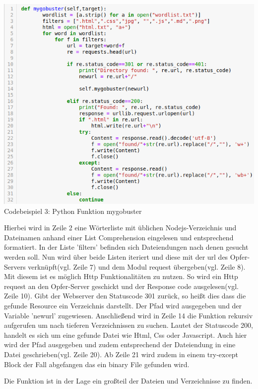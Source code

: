 \documentclass[12pt]{article}
\begin{document}
\begin{center}
\includegraphics[scale=0.5]{data/mygobuster.png}
Codebeispiel 3: Python Funktion mygobuster
\end{center}
Hierbei wird in Zeile 2 eine Wörterliste mit üblichen Nodejs-Verzeichnis und Dateinamen anhand einer List Comprehension eingelesen und entsprechend formatiert.
In der Liste 'filters' befinden sich Dateiendungen nach denen gesucht werden soll. Nun wird über beide Listen iteriert und diese mit der url des Opfer-Servers verknüpft(vgl. Zeile 7) und dem Modul request übergeben(vgl. Zeile 8). Mit diesem ist es möglich Http Funktionalitäten zu nutzen. So wird ein Http request an den Opfer-Server geschickt und der Response code ausgelesen(vgl. Zeile 10). Gibt der Webserver den Statuscode 301 zurück, so heißt dies dass die gefunde Resource ein Verzeichnis darstellt. Der Pfad wird ausgegeben und der Variable 'newurl' zugewiesen. Anschließend wird in Zeile 14 die Funktion rekursiv aufgerufen um nach tieferen Verzeichnissen zu suchen. Lautet der Statuscode 200, handelt es sich um eine gefunde Datei wie Html, Css oder Javascript. Auch hier wird der Pfad ausgegeben und zudem entsprechend
 der Dateiendung in eine Datei geschrieben(vgl. Zeile 20). Ab Zeile 21 wird zudem in einem try-except Block der Fall abgefangen das ein binary File gefunden wird.  
 
 
Die Funktion ist in der Lage ein großteil der Dateien und Verzeichnisse zu finden. 
\end{document}
